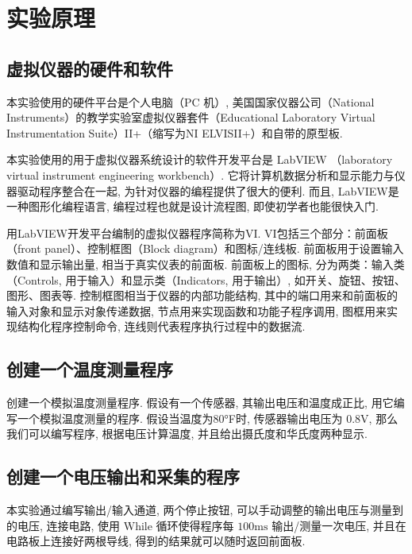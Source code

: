 \documentclass[11pt]{article}
\begin{document}
\section{实验原理}


	
	\subsection{虚拟仪器的硬件和软件}
	
	本实验使用的硬件平台是个人电脑（PC 机）, 美国国家仪器公司（National Instruments）的教学实验室虚拟仪器套件（Educational Laboratory Virtual Instrumentation Suite）II+（缩写为NI ELVISII+）和自带的原型板. 
	
	本实验使用的用于虚拟仪器系统设计的软件开发平台是 LabVIEW （laboratory virtual instrument engineering workbench）. 它将计算机数据分析和显示能力与仪器驱动程序整合在一起, 为针对仪器的编程提供了很大的便利. 而且,  LabVIEW是一种图形化编程语言, 编程过程也就是设计流程图, 即使初学者也能很快入门. 
	
	用LabVIEW开发平台编制的虚拟仪器程序简称为VI.  VI包括三个部分：前面板（front panel）、控制框图（Block diagram）和图标/连线板.  前面板用于设置输入数值和显示输出量, 相当于真实仪表的前面板. 前面板上的图标, 分为两类：输入类（Controls, 用于输入）和显示类（Indicators, 用于输出）, 如开关、旋钮、按钮、图形、图表等. 控制框图相当于仪器的内部功能结构, 其中的端口用来和前面板的输入对象和显示对象传递数据, 节点用来实现函数和功能子程序调用, 图框用来实现结构化程序控制命令, 连线则代表程序执行过程中的数据流. 
	
	\subsection{创建一个温度测量程序} 
	
	创建一个模拟温度测量程序. 假设有一个传感器, 其输出电压和温度成正比, 用它编写一个模拟温度测量的程序. 假设当温度为80°F时, 传感器输出电压为 $0.8\mathrm V$, 那么我们可以编写程序, 根据电压计算温度, 并且给出摄氏度和华氏度两种显示.
	
	
	\subsection{创建一个电压输出和采集的程序}
	
	本实验通过编写输出/输入通道, 两个停止按钮, 可以手动调整的输出电压与测量到的电压, 连接电路, 使用 While 循环使得程序每 $100\mathrm{ms}$ 输出/测量一次电压, 并且在电路板上连接好两根导线, 得到的结果就可以随时返回前面板.
	
\end{document}
